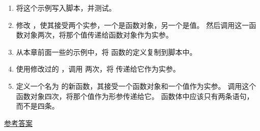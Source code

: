 \begin{exercise}
\begin{enumerate}
\item 将这个示例写入脚本，并测试。

\item 修改 {\em {}}，使其接受两个实参，一个是函数对象，另一个是值。
   然后调用这一函数对象两次，将那个值传递给函数对象作为实参。

\item 从本章前面一些的示例中，将 {\em {}} 函数的定义复制到脚本中。

\item 使用修改过的 {\em {}} ，调用 {\em {}} 两次，将 {\em {}} 传递给它作为实参。

\item 定义一个名为 {\em {}} 的新函数，其接受一个函数对象和一个值作为实参。 调用这个函数对象四次，将那个值作为形参传递给它。 函数体中应该只有两条语句，而不是四条。

\end{enumerate}


\href{http://thinkpython2.com/code/do_four.py}{参考答案}

\end{exercise}



